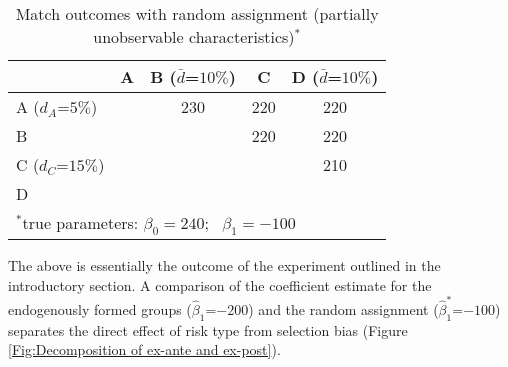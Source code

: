 \begin{table}[htbp!]
\small
  \begin{center}
    \begin{minipage}[c]{0.35\linewidth}
      \caption{Match outcomes with random assignment (partially unobservable characteristics)$^*$}
      \label{Tab:Match outcomes with random assignment partially unobservable characteristics}
    \end{minipage} \hfill
    \begin{minipage}[c]{0.6\linewidth}
\centering
\begin{tabular}{l||cccc}
	& \multicolumn{1}{|c|}{A} & \multicolumn{1}{|c|}{B ($\bar d$=$10\%$)} & \multicolumn{1}{|c|}{C} & \multicolumn{1}{|c|}{D ($\bar d$=$10\%$)} \\
\hline \hline
A ($d_A$=$5\%$) && \multicolumn{1}{|c|}{230} & \multicolumn{1}{|c|}{220} & \multicolumn{1}{|c|}{220} \\
\cline{3-5} \cline{1-1}
B & && \multicolumn{1}{|c|}{220} & \multicolumn{1}{|c|}{220} \\
\cline{4-5} \cline{1-1}
C ($d_C$=$15\%$) && & & \multicolumn{1}{|c|}{210}\\
\cline{5-5} \cline{1-1}
D  && & & \\
\cline{1-1}
\multicolumn{5}{l}{\footnotesize $^*$true parameters: $\beta_0=240$; \ $\beta_1=-100$}
\end{tabular}
    \end{minipage}
  \end{center}
\end{table}

The above is essentially the outcome of the experiment outlined in the introductory section. A comparison of the coefficient estimate for the endogenously formed groups ($\hat \beta_1$=$-200$) and the random assignment ($\hat \beta_1^*$=$-100$) separates the direct effect of risk type from selection bias (Figure \ref{Fig:Decomposition of ex-ante and ex-post}).

